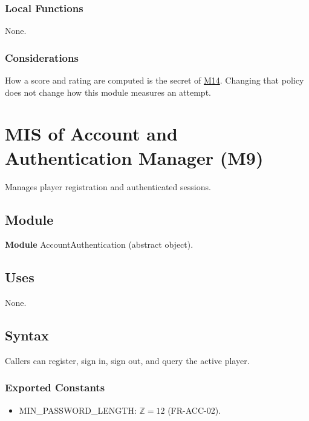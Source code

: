 \documentclass[12pt, titlepage]{article}
\newcommand{\Mref}[1]{\hyperref[sec:M#1]{M#1}}
\begin{document}
\subsubsection{Local Functions}

None.

\subsubsection{Considerations}

How a score and rating are computed is the secret of \Mref{14}. Changing that
policy does not change how this module measures an attempt.

\newpage
\section{MIS of Account and Authentication Manager (M9)} \label{sec:M9}

Manages player registration and authenticated sessions.

\subsection{Module}

\textbf{Module} AccountAuthentication (abstract object).

\subsection{Uses}

None.

\subsection{Syntax}

Callers can register, sign in, sign out, and query the active player.

\subsubsection{Exported Constants}

\begin{itemize}
\item MIN\_PASSWORD\_LENGTH: $\mathbb{Z} = 12$ (FR-ACC-02).
\end{itemize}
\end{document}
